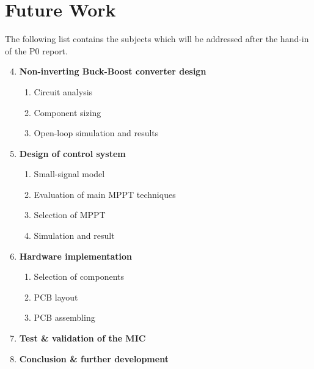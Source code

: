 \chapter{Future Work}
The following list contains the subjects which will be addressed after the hand-in of the P0 report.

\renewcommand{\labelenumii}{\arabic{enumii}}
\begin{enumerate}
	\setcounter{enumi}{3}
	\item \textbf{Non-inverting Buck-Boost converter design}
	\begin{enumerate}
		\item Circuit analysis
		\item Component sizing
		\item Open-loop simulation and results
	\end{enumerate}

	\item \textbf{Design of control system}
	\begin{enumerate}
		\item Small-signal model
		\item Evaluation of main MPPT techniques
		\item Selection of MPPT
		\item Simulation and result
	\end{enumerate}
	
	\item \textbf{Hardware implementation}
	\begin{enumerate}
		\item Selection of components
		\item PCB layout
		\item PCB assembling
	\end{enumerate}

	\item \textbf{Test \& validation of the MIC}
	\item \textbf{Conclusion \& further development}
\end{enumerate}